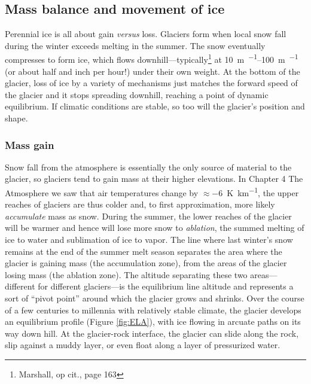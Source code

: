 \documentclass[amstex,12pt]{book}
\begin{document}
\subsection{Mass balance and movement of ice}
Perennial ice is all about gain \textit{versus} loss. Glaciers form when local snow fall during the winter exceeds melting in the summer. The snow eventually compresses to form ice, which flows downhill---typically\footnote{Marshall, op cit., page 163} at \SIrange{10}{100}{\metre\per\year} (or about half and inch per hour!) under their own weight. At the bottom of the glacier, loss of ice by a variety of mechanisms just matches the forward speed of the glacier and it stops spreading downhill, reaching a point of dynamic equilibrium. If climatic conditions are stable, so too will the glacier's position and shape.\\

\subsubsection{Mass gain} \label{massgain} Snow fall from the atmosphere is essentially the only source of material to the glacier, so glaciers tend to gain mass at their higher elevations. In Chapter 4 The Atmosphere we saw that air temperatures change by $\approx$\SI{-6}{\kelvin\per\kilo\metre}, the upper reaches of glaciers are thus colder and, to first approximation, more likely \emph{accumulate} mass as snow. During the summer, the lower reaches of the glacier will be warmer and hence will lose more snow to \emph{ablation}, the summed melting of ice to water and sublimation of ice to vapor. The line where last winter's snow remains at the end of the summer melt season separates the area where the glacier is gaining mass (the accumulation zone), from the areas of the glacier losing mass (the ablation zone). The altitude separating these two areas---different for different glaciers---is the equilibrium line altitude and represents a sort of ``pivot point'' around which the glacier grows and shrinks. Over the course of a few centuries to millennia with relatively stable climate, the glacier develops an equilibrium profile (Figure \ref{fig:ELA}), with ice flowing in arcuate paths on its way down hill. At the glacier-rock interface, the glacier can slide along the rock, slip against a muddy layer, or even float along a layer of pressurized water. \\
\end{document}
